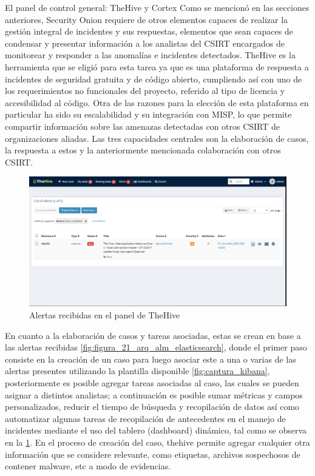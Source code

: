    \begin{section}{El panel de control general: TheHive y Cortex}
     Como se mencionó en las secciones anteriores, Security Onion requiere de otros elementos capaces de realizar la gestión integral de incidentes y sus respuestas, elementos que sean capaces de condensar y presentar información a los analistas del CSIRT encargados de monitorear y responder a las anomalías e incidentes detectados.  TheHive es la herramienta que se eligió para esta tarea ya que es una plataforma de respuesta a incidentes de seguridad gratuita y de código abierto, cumpliendo así con uno de los requerimientos no funcionales del proyecto, referido al tipo de licencia y accesibilidad al código. Otra de las razones para la elección de esta plataforma en particular ha sido su escalabilidad y su integración con MISP, lo que permite compartir información sobre las amenazas detectadas con otros CSIRT de organizaciones aliadas. Las tres capacidades centrales son la elaboración de casos, la respuesta a estos y la anteriormente mencionada colaboración con otros CSIRT.\par
     \begin{figure}[H]
        \centering
        \includegraphics[width=1\textwidth]{./iteracion_1_imagenes/figura_23_alerta_panel_thehive.png}
        \caption{ Alertas recibidas en el panel de TheHive\cite{thehive}}
        \label{fig:alerta_panel_thehive}
     \end{figure}
        \FloatBarrier
        En cuanto a la elaboración de casos y tareas asociadas, estas se crean en base a las alertas recibidas \ref{fig:figura_21_arq_alm_elasticsearch}, donde el primer paso consiste en la creación de un caso para luego asociar este a una o varias de las alertas presentes utilizando la plantilla disponible \ref{fig:captura_kibana}, posteriormente es posible agregar tareas asociadas al caso, las cuales se pueden asignar a distintos analistas; a continuación es posible sumar métricas y campos personalizados, reducir el tiempo de búsqueda y recopilación de datos así como automatizar algunas tareas de recopilación de antecedentes en el manejo de incidentes mediante el uso del tablero (dashboard) dinámico, tal como se observa en la \ref{fig:alerta_panel_thehive}. En el proceso de creación del caso, thehive permite agregar cualquier otra información que se considere relevante, como etiquetas, archivos sospechosos de contener malware, etc a modo de evidencias.

\end{section}
